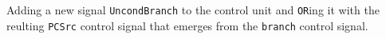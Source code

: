 \documentclass[11pt]{article}
\begin{document}
Adding a new signal \texttt{UncondBranch} to the control unit and \texttt{OR}ing it with the reulting \texttt{PCSrc} control signal that emerges from the \texttt{branch} control signal.









































%
%
%
%
%
%
%
%
\end{document}
